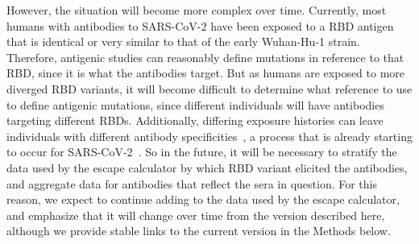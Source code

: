 \documentclass[9pt,twocolumn,twoside]{gsajnl_modified}
\begin{document}
However, the situation will become more complex over time.
Currently, most humans with antibodies to SARS-CoV-2 have been exposed to a RBD antigen that is identical or very similar to that of the early Wuhan-Hu-1 strain.
Therefore, antigenic studies can reasonably define mutations in reference to that RBD, since it is what the antibodies target.
But as humans are exposed to more diverged RBD variants, it will become difficult to determine what reference to use to define antigenic mutations, since different individuals will have antibodies targeting different RBDs.
Additionally, differing exposure histories can leave individuals with different antibody specificities~\citep{cobey2017immune}, a process that is already starting to occur for SARS-CoV-2~\citep{greaney2021sars}.
So in the future, it will be necessary to stratify the data used by the escape calculator by which RBD variant elicited the antibodies, and aggregate data for antibodies that reflect the sera in question.
For this reason, we expect to continue adding to the data used by the escape calculator, and emphasize that it will change over time from the version described here, although we provide stable links to the current version in the Methods below. 
\end{document}
